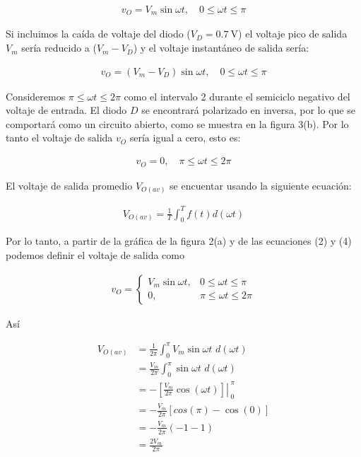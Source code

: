 \documentclass{article}
\begin{document}
\begin{align}
	v_O = V_m \sin{\omega t}, \quad 0 \leq \omega t \leq \pi
\end{align}

Si incluimos la caída de voltaje del diodo ($V_D = \qty{0.7}{\volt}$) el voltaje pico de salida $V_m$ sería reducido a ($V_m - V_D$) y el voltaje instantáneo de salida sería:

\begin{align}
	v_O = (V_m - V_D) \sin{\omega t}, \quad 0 \leq \omega t \leq \pi
\end{align}

Consideremos $\pi \leq \omega t \leq 2 \pi$ como el intervalo 2 durante el semiciclo negativo del voltaje de entrada. El diodo $D$ se encontrará polarizado en inversa, por lo que se comportará como un circuito abierto, como se muestra en la figura 3(b). Por lo tanto el voltaje de salida $v_O$ sería igual a cero, esto es:

\begin{align}
	v_O = 0, \quad \pi \leq \omega t \leq 2 \pi
\end{align}

El voltaje de salida promedio $V_{O(av)}$ se encuentar usando la siguiente ecuación:

\begin{align}
	V_{O(av)} = \frac{1}{T} \int_{0}^{T} f(t) d(\omega t)
\end{align}

Por lo tanto, a partir de la gráfica de la figura 2(a) y de las ecuaciones (2) y (4) podemos definir el voltaje de salida como

\begin{align}
	v_O= \left\{ 
	\begin{array}{lc} V_m \sin{\omega t}, & 0 \leq \omega t \leq \pi \\
	0, & \pi \leq \omega t \leq 2\pi
	 \end{array} \right.
\end{align}


Así

\begin{align}
	V_{O(av)} &= \frac{1}{2\pi} \int_{0}^{\pi} V_m \sin{\omega t} \,\, d(\omega t) \nonumber \\
	 &= \frac{V_m}{2\pi} \int_{0}^{\pi} \sin{\omega t} \,\, d(\omega t) \nonumber \\
	&= - \left.{\left[ \frac{V_m}{2\pi} \cos({\omega t}) \right]}\right|_{\;0}^{\;\pi} \nonumber \\
	&= - \frac{V_m}{2\pi} \left[ cos (\pi) - \cos(0) \right] \nonumber \\
	&= - \frac{V_m}{2\pi} (-1 - 1) \nonumber \\
	&= \frac{2 V_m}{2\pi} \nonumber
\end{align}
\end{document}
